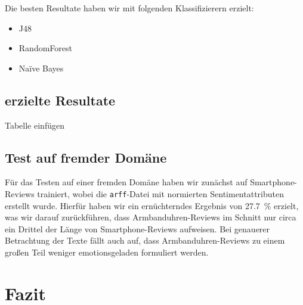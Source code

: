\documentclass[a4paper]{article}
\newcommand{\ourextension}[1]{\texttt{#1}}
\begin{document}
Die besten Resultate haben wir mit folgenden Klassifizierern erzielt:
\begin{itemize}
	\item J48 
	\item RandomForest
	\item Naïve Bayes
\end{itemize}



\subsection{erzielte Resultate}

Tabelle einfügen



\subsection{Test auf fremder Domäne}

Für das Testen auf einer fremden Domäne haben wir zunächst auf Smartphone-Reviews trainiert, wobei die \ourextension{arff}-Datei mit normierten Sentimentattributen  erstellt wurde. Hierfür haben wir ein ernüchterndes Ergebnis von \SI{27.7}{\%} erzielt, was wir darauf zurückführen, dass Armbanduhren-Reviews im Schnitt nur circa ein Drittel der Länge von Smartphone-Reviews aufweisen. Bei genauerer Betrachtung der Texte fällt auch auf, dass Armbanduhren-Reviews zu einem großen Teil weniger emotionsgeladen formuliert werden.



\section{Fazit}
\end{document}
